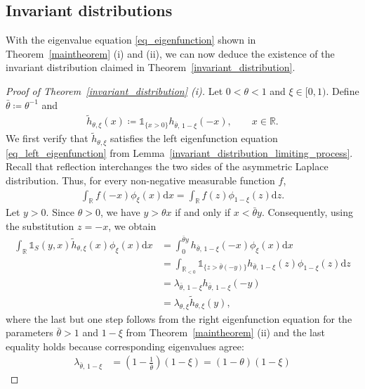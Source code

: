 \documentclass[10pt,a4paper]{amsart}
\newcommand{\R}{\mathbb{R}} %
\newcommand{\1}{\mathds{1}}
\renewcommand{\d}{\mathrm{d}}
\begin{document}
\subsection{Invariant distributions}\label{invariant distributions}
With the eigenvalue equation \eqref{eq_eigenfunction} shown in Theorem~\ref{maintheorem} (i) and (ii), we can now deduce the existence of the invariant distribution claimed in Theorem~\ref{invariant_distribution}.
\begin{proof}[Proof of Theorem~\ref{invariant_distribution} (i)]
Let $0<\theta<1$ and $\xi\in[0,1)$. Define $\bar\theta\coloneqq \theta^{-1}$ and
\begin{align*} 
    \tilde h_{\theta,\xi}(x) \coloneqq \mathds{1}_{\{x>0\}} h_{\bar\theta,\,1-\xi}(-x), \qquad x\in\R. 
\end{align*} 
We first verify that $\tilde h_{\theta,\xi}$ satisfies the left eigenfunction equation \eqref{eq_left_eigenfunction} from Lemma~\ref{invariant_distribution_limiting_process}. Recall that reflection interchanges the two sides of the asymmetric Laplace distribution. Thus, for every non-negative measurable function $f$, 
\begin{align*}
    \int_\R f(-x)\phi_\xi( x)\d x = \int_\R f(z)\phi_{1-\xi}( z)\d z. 
\end{align*} 
Let $y>0$. Since $\theta>0$, we have $y>\theta x $ if and only if $x<\bar\theta y$. 
Consequently, using the substitution $z=-x$, we obtain
 \begin{align*} 
    \int_\R \mathds{1}_S(y,x) \tilde h_{\theta,\xi}(x) \phi_\xi( x)\d x 
     &= \int_0^{\bar\theta y} h_{\bar\theta,\,1-\xi}(-x) \phi_\xi( x)\d x 
    \\ &= \int_{\R_{<0}} \mathds{1}_{\{z>\bar\theta(-y)\}} h_{\bar\theta,\,1-\xi}(z) \phi_{1-\xi}( z)\d z 
    \\ &= \lambda_{\bar\theta,\,1-\xi} h_{\bar\theta,\,1-\xi}(-y)
    \\ &= \lambda_{\theta,\xi} \tilde h_{\theta,\xi}(y), 
\end{align*}
where the last but one step follows from the right eigenfunction equation for the parameters $\bar\theta>1$ and $1-\xi$ from Theorem~\ref{maintheorem} (ii) and the last equality holds because corresponding eigenvalues agree:
\begin{align} 
    \lambda_{\bar\theta,\,1-\xi} 
    &= \left( 1-\frac{1}{\bar\theta} \right)(1-\xi) 
    = (1-\theta)(1-\xi) 

\end{align}
\end{proof}
\end{document}
